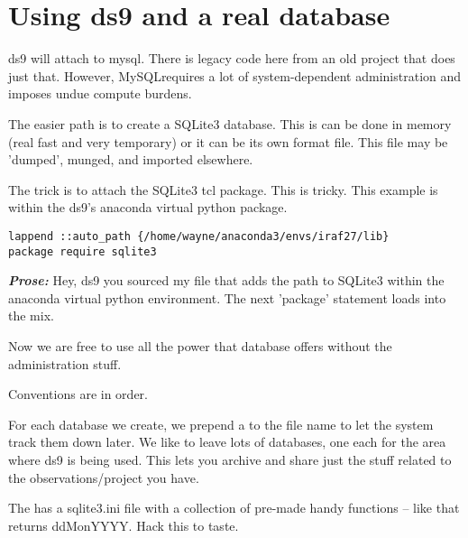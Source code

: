 \section{Using ds9 and a real database}

ds9 will attach to mysql. There is legacy code here from an old project
that does just that. However, MySQL\texttrademark requires a lot of
system-dependent administration and imposes undue compute burdens.

The easier path is to create a SQLite3 database. This is can be done
in memory (real fast and very temporary) or it can be its own format
file. This file may be 'dumped', munged, and imported elsewhere.

The trick is to attach the SQLite3 tcl package. This is tricky.
This example is within the ds9's anaconda virtual python package.

\begingroup \fontsize{10pt}{10pt}
\selectfont
\begin{verbatim} 
lappend ::auto_path {/home/wayne/anaconda3/envs/iraf27/lib}
package require sqlite3
\end{verbatim}
\endgroup

\textbf{\emph{Prose:}} Hey, ds9 you sourced my file that adds the path
to SQLite3 within the anaconda  virtual python
environment. The next 'package' statement loads  into the
mix.

Now we are free to use all the power that database offers without
the administration stuff.

Conventions are in order.

For each database we create, we prepend a  to the file
name to let the system track them down later. We like to leave
lots of databases, one each for the area where ds9 is being used.
This lets you archive and share just the stuff related to the
observations/project you have.

The  has a sqlite3.ini file with a collection of
pre-made handy functions -- like  that returns ddMonYYYY.
Hack this to taste.
